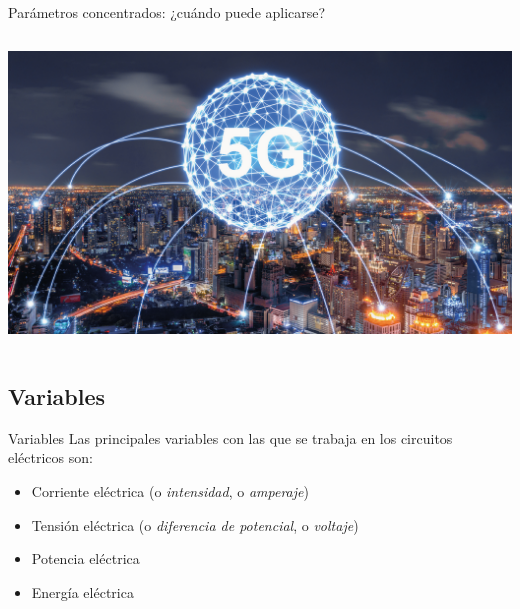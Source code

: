 \documentclass[aspectratio=169, xcolor={usenames,svgnames,dvipsnames}]{beamer}
\begin{document}
\begin{frame}{Parámetros concentrados: \hspace{5mm} ¿cuándo puede aplicarse?}
\begin{columns}[T]
\begin{column}{0.49\columnwidth}
        \begin{center}
            \includegraphics[height=0.3\textheight]{../figs/5G.jpg} 
        \end{center}
    \end{column}  
    \end{columns}
    
\end{frame}


\subsection{Variables}

\begin{frame}{Variables}
    Las principales \alert{variables} con las que se trabaja en los circuitos eléctricos son:
    \vspace{5mm}
    \begin{itemize}
        \item Corriente eléctrica (o \textit{intensidad}, o \textit{amperaje})
        \vspace{2mm}
        \item Tensión eléctrica (o \textit{diferencia de potencial}, o \textit{voltaje})
        \vspace{2mm}
        \item Potencia eléctrica
        \vspace{2mm}
        \item Energía eléctrica
    \end{itemize}    
\end{frame}

\end{document}

